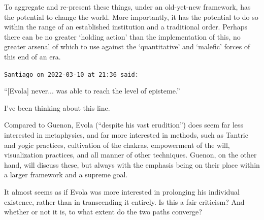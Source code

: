 \begin{footnotesize}
\begin{sffamily}
To aggregate and re-present these things, under an old-yet-new framework, has the potential to change the world. More
importantly, it has the potential to do so within the range of an established institution and a traditional order.
Perhaps there can be no greater `holding action' than the implementation of this, no greater
arsenal of which to use against the `quantitative' and `malefic' forces
of this end of an era.


\hfill

\texttt{Santiago on 2022-03-10 at 21:36 said: }

“[Evola] never... was able to reach the level of episteme.”

I've been thinking about this line.

Compared to Guenon, Evola (“despite his vast erudition”) does seem far less interested in metaphysics, and far more
interested in methods, such as Tantric and yogic practices, cultivation of the chakras, empowerment of the will,
visualization practices, and all manner of other techniques. Guenon, on the other hand, will
discuss these, but always with the emphasis being on their place within a larger framework and a supreme goal. 

It almost seems as if Evola was more interested in prolonging his individual existence, rather than in transcending it
entirely. Is this a fair criticism? And whether or not it is, to what extent do the two paths converge?

\end{sffamily}\end{footnotesize}
